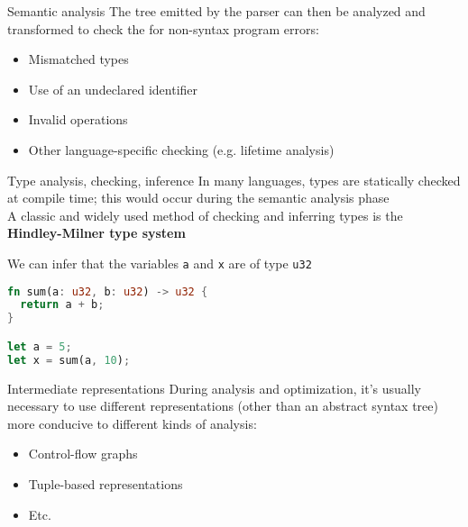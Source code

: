\documentclass[../index.tex]{subfiles}
\begin{document}
\renewcommand{\sectiontitle}{Semantic analysis}
\renewcommand{\currenttitle}{\sectiontitle}
\begin{frame}[fragile]{\currenttitle}
  The tree emitted by the parser can then be analyzed and transformed to check
  the for non-syntax program errors:

  \begin{itemize}
    \item Mismatched types
    \item Use of an undeclared identifier
    \item Invalid operations
    \item Other language-specific checking (e.g. lifetime analysis)
  \end{itemize}
\end{frame}
  
\renewcommand{\currenttitle}{Type analysis, checking, inference}
\begin{frame}[fragile]{\currenttitle}
  In many languages, types are statically checked at compile time; this would
  occur during the semantic analysis phase \\[2em]

  A classic and widely used method of checking and inferring types is the
  \textbf{Hindley-Milner type system}

  We can infer that the variables \texttt{a} and \texttt{x} are of type
  \texttt{u32} 

  \begin{lstlisting}[language=Rust, xleftmargin=5mm]
fn sum(a: u32, b: u32) -> u32 {
  return a + b;
}

let a = 5;
let x = sum(a, 10);
  \end{lstlisting}
\end{frame}
  
\renewcommand{\currenttitle}{Intermediate representations}
\begin{frame}[fragile]{\currenttitle}
  During analysis and optimization, it's usually necessary to use different
  representations (other than an abstract syntax tree) more conducive to
  different kinds of analysis:

  \begin{itemize}
    \item Control-flow graphs
    \item Tuple-based representations
    \item Etc.
  \end{itemize}
\end{frame}
  
\end{document}
